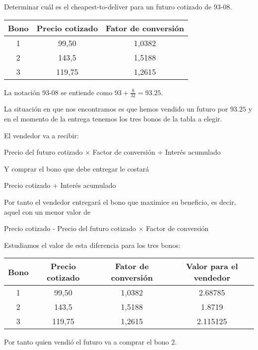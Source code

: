 \begin{problem}[2]
Determinar cuál es el cheapest-to-deliver para un futuro cotizado de 93-08.

\begin{center}
\begin{tabular}{|c|c|c|}
\hline
\textbf{Bono} & \textbf{Precio cotizado} & \textbf{Fator de conversión} \\
\hline
1 & 99,50 & 1,0382 \\
2 & 143,5 & 1,5188 \\
3 & 119,75 & 1,2615\\
\hline
\end{tabular}
\end{center}

\solution
{}

La notación 93-08 se entiende como $93 + \frac{8}{32} = 93.25$.

La situación en que nos encontramos es que hemos vendido un futuro por $93.25$ y en el momento de la entrega tenemos
los tres bonos de la tabla a elegir.

El vendedor va a recibir:
\begin{center}
Precio del futuro cotizado $\times$ Factor de conversión + Interés acumulado
\end{center}
Y comprar el bono que debe entregar le costará
\begin{center}
Precio cotizado + Interés acumulado
\end{center}

Por tanto el vendedor entregará el bono que maximice su beneficio, es decir, aquel con un menor valor de
\begin{center}
Precio cotizado - Precio del futuro cotizado $\times$ Factor de conversión
\end{center}

Estudiamos el valor de esta diferencia para los tres bonos:

\begin{center}
\begin{tabular}{|c|c|c|c|}
\hline
\textbf{Bono} & \textbf{Precio cotizado} & \textbf{Fator de conversión} & \textbf{Valor para el vendedor} \\
\hline
1 & 99,50 & 1,0382 & 2.68785 \\
2 & 143,5 & 1,5188 & 1.8719 \\
3 & 119,75 & 1,2615 & 2.115125\\
\hline
\end{tabular}
\end{center}

Por tanto quien vendió el futuro va a comprar el bono 2.

\end{problem}

